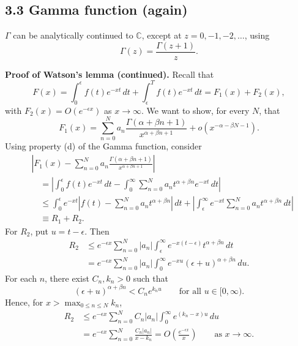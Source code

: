 \subsection*{3.3 Gamma function (again)}

$\Gamma$ can be analytically continued to $\mathbb{C}$, except at
$z=0,-1,-2,\ldots$, using
\[
    \Gamma(z)=\frac{\Gamma(z+1)}{z}.
\]

\noindent\textbf{Proof of Watson's lemma (continued).}
Recall that
\[
    F(x)=\int_0^\epsilon f(t)e^{-xt}\,dt
        +\int_\epsilon^T f(t)e^{-xt}\,dt
        =F_1(x)+F_2(x),
\]
with $F_2(x)=O(e^{-\epsilon x})$ as $x\to\infty$.
We want to show, for every $N$, that
\[
    F_1(x)=\sum_{n=0}^N
    a_n\frac{\Gamma(\alpha+\beta n+1)}{x^{\alpha+\beta n+1}}
    +o\!\left(x^{-\alpha-\beta N-1}\right).
\]
Using property (d) of the Gamma function, consider
\begin{align*}
    &\left|F_1(x)-\sum_{n=0}^N
    a_n\frac{\Gamma(\alpha+\beta n+1)}{x^{\alpha+\beta n+1}}\right|\\
    &\quad=\left|\int_0^\epsilon f(t)e^{-xt}\,dt
    -\int_0^\infty\sum_{n=0}^N a_n t^{\alpha+\beta n}e^{-xt}\,dt\right|\\
    &\quad\leq\int_0^\epsilon e^{-xt}
    \left|f(t)-\sum_{n=0}^N a_n t^{\alpha+\beta n}\right|\,dt
    +\left|\int_\epsilon^\infty e^{-xt}
    \sum_{n=0}^N a_n t^{\alpha+\beta n}\,dt\right|\\
    &\quad\equiv R_1+R_2.
\end{align*}
For $R_2$, put $u=t-\epsilon$. Then
\begin{align*}
    R_2
    &\leq e^{-\epsilon x}\sum_{n=0}^N |a_n|
    \int_\epsilon^\infty e^{-x(t-\epsilon)}t^{\alpha+\beta n}\,dt\\
    &=e^{-\epsilon x}\sum_{n=0}^N |a_n|
    \int_0^\infty e^{-xu}(\epsilon+u)^{\alpha+\beta n}\,du.
\end{align*}
For each $n$, there exist $C_n,k_n>0$ such that
\[
    (\epsilon+u)^{\alpha+\beta n}<C_n e^{k_nu}
    \qquad\text{for all }u\in[0,\infty).
\]
Hence, for $x>\max_{0\leq n\leq N}k_n$,
\begin{align*}
    R_2
    &\leq e^{-\epsilon x}\sum_{n=0}^N C_n|a_n|
    \int_0^\infty e^{(k_n-x)u}\,du\\
    &=e^{-\epsilon x}\sum_{n=0}^N\frac{C_n|a_n|}{x-k_n}
    =O\!\left(\frac{e^{-\epsilon x}}{x}\right)
    \qquad\text{as }x\to\infty.
\end{align*}


